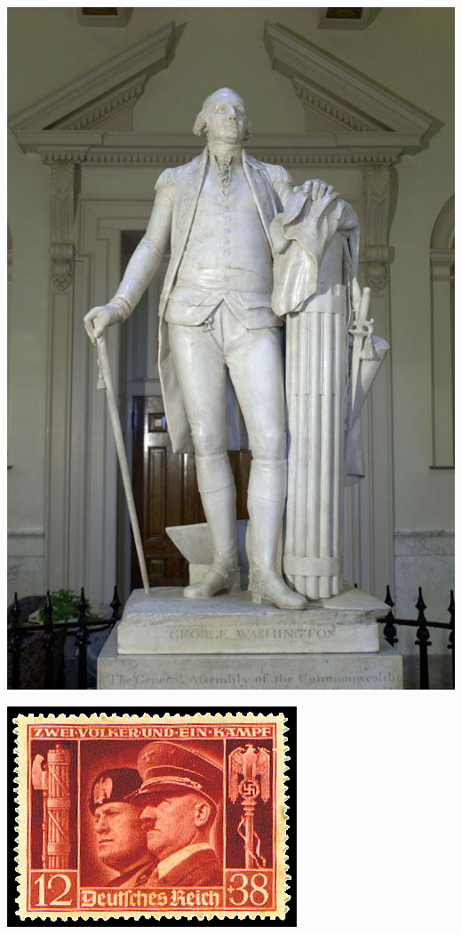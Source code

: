 \begin{frame}
    \centering
    \includegraphics[width=.9\textwidth]{img/fasces/washington-houdon.jpg} \\
\end{frame}

\begin{frame}
    \centering
    \includegraphics[width=.9\textwidth]{img/reich-stamp.png} \\
\end{frame}

